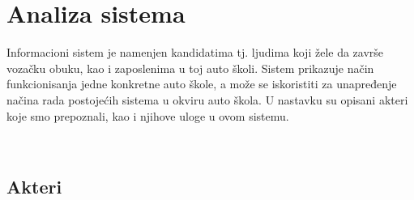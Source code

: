 \section{Analiza sistema}
\label{sec:naslov1}
 
Informacioni sistem je namenjen kandidatima tj. ljudima koji žele da završe vozačku obuku, kao i zaposlenima u toj auto školi. 
Sistem prikazuje način funkcionisanja jedne konkretne auto škole, a može se iskoristiti za unapređenje načina rada postojećih sistema u okviru auto škola.
U nastavku su opisani akteri koje smo prepoznali, kao i njihove uloge u ovom sistemu.

\
\subsection {Akteri}
\label{subsec:podnaslov1}
